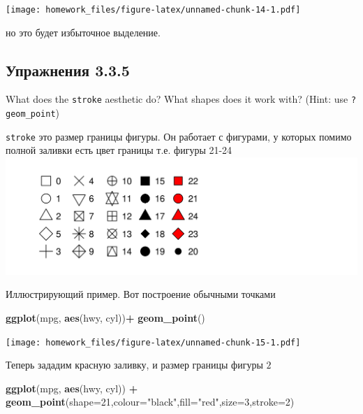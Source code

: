 \documentclass[]{book}
\newenvironment{Shaded}{\begin{snugshade}}{\end{snugshade}}
\newcommand{\KeywordTok}[1]{\textcolor[rgb]{0.13,0.29,0.53}{\textbf{#1}}}
\newcommand{\DataTypeTok}[1]{\textcolor[rgb]{0.13,0.29,0.53}{#1}}
\newcommand{\DecValTok}[1]{\textcolor[rgb]{0.00,0.00,0.81}{#1}}
\newcommand{\StringTok}[1]{\textcolor[rgb]{0.31,0.60,0.02}{#1}}
\newcommand{\OperatorTok}[1]{\textcolor[rgb]{0.81,0.36,0.00}{\textbf{#1}}}
\newcommand{\NormalTok}[1]{#1}
\begin{document}
\texttt{[image: homework\_files/figure-latex/unnamed-chunk-14-1.pdf]}

но это будет избыточное выделение.

\subsection*{Упражнения 3.3.5}\label{-3.3.5}

What does the \texttt{stroke} aesthetic do? What shapes does it work
with? (Hint: use \texttt{?geom\_point})

\texttt{stroke} это размер границы фигуры. Он работает с фигурами, у
которых помимо полной заливки есть цвет границы т.е. фигуры 21-24
\includegraphics{img/shapes.png}

Иллюстрирующий пример. Вот построение обычными точками

\begin{Shaded}
\begin{Highlighting}[]
\KeywordTok{ggplot}\NormalTok{(mpg, }\KeywordTok{aes}\NormalTok{(hwy, cyl))}\OperatorTok{+}
\StringTok{ }\KeywordTok{geom_point}\NormalTok{()}
\end{Highlighting}
\end{Shaded}

\texttt{[image: homework\_files/figure-latex/unnamed-chunk-15-1.pdf]}

Теперь зададим красную заливку, и размер границы фигуры \(2\)

\begin{Shaded}
\begin{Highlighting}[]
\KeywordTok{ggplot}\NormalTok{(mpg, }\KeywordTok{aes}\NormalTok{(hwy, cyl)) }\OperatorTok{+}
\StringTok{ }\KeywordTok{geom_point}\NormalTok{(}\DataTypeTok{shape=}\DecValTok{21}\NormalTok{,}\DataTypeTok{colour=}\StringTok{"black"}\NormalTok{,}\DataTypeTok{fill=}\StringTok{"red"}\NormalTok{,}\DataTypeTok{size=}\DecValTok{3}\NormalTok{,}\DataTypeTok{stroke=}\DecValTok{2}\NormalTok{)}
\end{Highlighting}
\end{Shaded}
\end{document}
